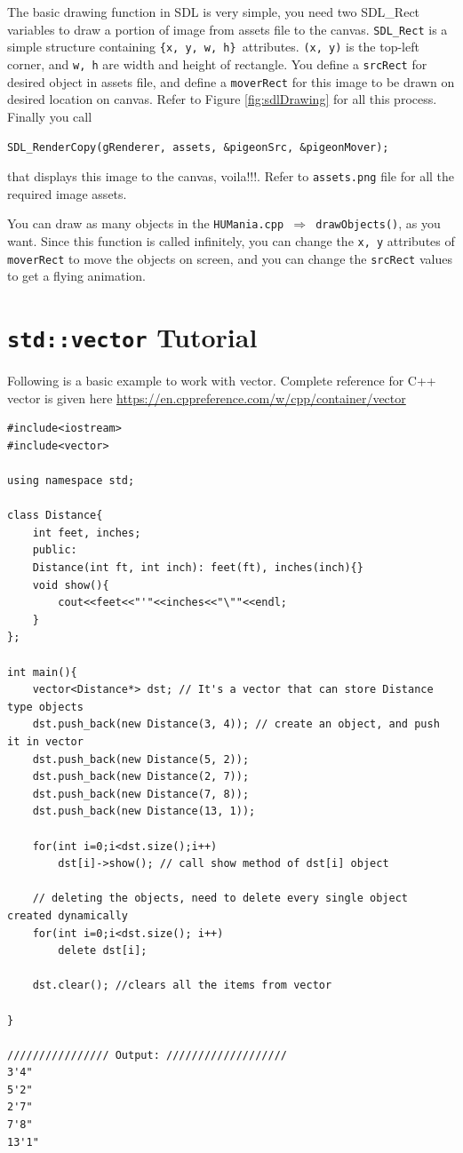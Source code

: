 \documentclass[a4paper,12pt]{article}
\begin{document}
	The basic drawing function in SDL is very simple, you need two SDL\_Rect variables to draw a portion of image from assets file to the canvas. \texttt{SDL\_Rect} is a simple structure containing \texttt{\{x, y, w, h\} }attributes. \texttt{(x, y)} is the top-left corner, and \texttt{w, h} are width and height of rectangle. You define a \texttt{srcRect} for desired object in assets file, and define a \texttt{moverRect} for this image to be drawn on desired location on canvas. Refer to Figure \ref{fig:sdlDrawing} for all this process.  Finally you call 
	
	\noindent \texttt{SDL\_RenderCopy(gRenderer, assets, \&pigeonSrc, \&pigeonMover);}
	
	\noindent that displays this image to the canvas, voila!!!. Refer to \texttt{assets.png} file for all the required image assets.
	
	You can draw as many objects in the \texttt{HUMania.cpp $ \Rightarrow $ drawObjects()}, as you want. Since this function is called infinitely, you can change the \texttt{x, y} attributes of \texttt{moverRect} to move the objects on screen, and you can change the \texttt{srcRect} values to get a flying animation.
	


\section{\texttt{std::vector} Tutorial} \label{vectorTutorial}

Following is a basic example to work with vector. Complete reference for C++ vector is given here \url{https://en.cppreference.com/w/cpp/container/vector}
\begin{lstlisting}
#include<iostream>
#include<vector>

using namespace std;

class Distance{
	int feet, inches;
	public:
	Distance(int ft, int inch): feet(ft), inches(inch){}
	void show(){
		cout<<feet<<"'"<<inches<<"\""<<endl;
	}
};

int main(){
	vector<Distance*> dst; // It's a vector that can store Distance type objects
	dst.push_back(new Distance(3, 4)); // create an object, and push it in vector
	dst.push_back(new Distance(5, 2));
	dst.push_back(new Distance(2, 7));
	dst.push_back(new Distance(7, 8));
	dst.push_back(new Distance(13, 1));
	
	for(int i=0;i<dst.size();i++)
		dst[i]->show(); // call show method of dst[i] object
		
	// deleting the objects, need to delete every single object created dynamically
	for(int i=0;i<dst.size(); i++)
		delete dst[i];
	
	dst.clear(); //clears all the items from vector
	
}

//////////////// Output: ///////////////////
3'4"
5'2"
2'7"
7'8"
13'1"
\end{lstlisting}
\end{document}
